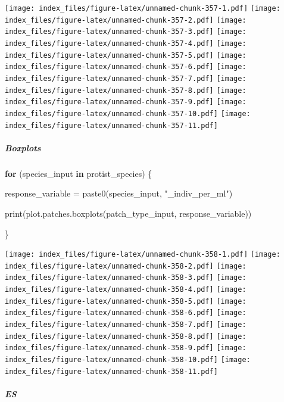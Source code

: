 \documentclass[
]{article}
\newenvironment{Shaded}{\begin{snugshade}}{\end{snugshade}}
\newcommand{\ControlFlowTok}[1]{\textcolor[rgb]{0.13,0.29,0.53}{\textbf{#1}}}
\newcommand{\FunctionTok}[1]{\textcolor[rgb]{0.00,0.00,0.00}{#1}}
\newcommand{\NormalTok}[1]{#1}
\newcommand{\OtherTok}[1]{\textcolor[rgb]{0.56,0.35,0.01}{#1}}
\newcommand{\StringTok}[1]{\textcolor[rgb]{0.31,0.60,0.02}{#1}}
\begin{document}
\texttt{[image: index\_files/figure-latex/unnamed-chunk-357-1.pdf]}
\texttt{[image: index\_files/figure-latex/unnamed-chunk-357-2.pdf]}
\texttt{[image: index\_files/figure-latex/unnamed-chunk-357-3.pdf]}
\texttt{[image: index\_files/figure-latex/unnamed-chunk-357-4.pdf]}
\texttt{[image: index\_files/figure-latex/unnamed-chunk-357-5.pdf]}
\texttt{[image: index\_files/figure-latex/unnamed-chunk-357-6.pdf]}
\texttt{[image: index\_files/figure-latex/unnamed-chunk-357-7.pdf]}
\texttt{[image: index\_files/figure-latex/unnamed-chunk-357-8.pdf]}
\texttt{[image: index\_files/figure-latex/unnamed-chunk-357-9.pdf]}
\texttt{[image: index\_files/figure-latex/unnamed-chunk-357-10.pdf]}
\texttt{[image: index\_files/figure-latex/unnamed-chunk-357-11.pdf]}

\hypertarget{boxplots-29}{%
\subparagraph{Boxplots}\label{boxplots-29}}

\begin{Shaded}
\begin{Highlighting}[]
\ControlFlowTok{for}\NormalTok{ (species\_input }\ControlFlowTok{in}\NormalTok{ protist\_species) \{}
  
\NormalTok{  response\_variable }\OtherTok{=} \FunctionTok{paste0}\NormalTok{(species\_input, }\StringTok{"\_indiv\_per\_ml"}\NormalTok{)}
  
  \FunctionTok{print}\NormalTok{(}\FunctionTok{plot.patches.boxplots}\NormalTok{(patch\_type\_input,}
\NormalTok{                              response\_variable))}
  
\NormalTok{\}}
\end{Highlighting}
\end{Shaded}

\texttt{[image: index\_files/figure-latex/unnamed-chunk-358-1.pdf]}
\texttt{[image: index\_files/figure-latex/unnamed-chunk-358-2.pdf]}
\texttt{[image: index\_files/figure-latex/unnamed-chunk-358-3.pdf]}
\texttt{[image: index\_files/figure-latex/unnamed-chunk-358-4.pdf]}
\texttt{[image: index\_files/figure-latex/unnamed-chunk-358-5.pdf]}
\texttt{[image: index\_files/figure-latex/unnamed-chunk-358-6.pdf]}
\texttt{[image: index\_files/figure-latex/unnamed-chunk-358-7.pdf]}
\texttt{[image: index\_files/figure-latex/unnamed-chunk-358-8.pdf]}
\texttt{[image: index\_files/figure-latex/unnamed-chunk-358-9.pdf]}
\texttt{[image: index\_files/figure-latex/unnamed-chunk-358-10.pdf]}
\texttt{[image: index\_files/figure-latex/unnamed-chunk-358-11.pdf]}

\hypertarget{es-13}{%
\subparagraph{ES}\label{es-13}}
\end{document}
